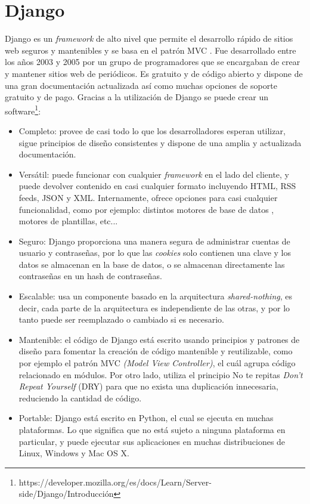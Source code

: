 \section{Django}
\label{cap:sec:django}
Django es un \textit{framework} de alto nivel que permite el desarrollo rápido de sitios web seguros y mantenibles y se basa en el patrón MVC \citep{TFGEmociones}. Fue desarrollado entre los años 2003 y 2005 por un grupo de programadores que se encargaban de crear y mantener sitios web de periódicos. 
Es gratuito y de código abierto y dispone de una gran documentación actualizada así como muchas opciones de soporte gratuito y de pago. Gracias a la utilización de Django se puede crear un software\footnote{https://developer.mozilla.org/es/docs/Learn/Server-side/Django/Introducción}:
\begin{itemize}
	\item Completo: provee de casi todo lo que los desarrolladores esperan utilizar, sigue principios de diseño consistentes y dispone de una amplia y actualizada documentación.
	\item Versátil: puede funcionar con cualquier \textit{framework} en el lado del cliente, y puede devolver contenido en casi cualquier formato incluyendo HTML, RSS feeds, JSON y XML. Internamente, ofrece opciones para casi cualquier funcionalidad, como por ejemplo: distintos motores de base de datos , motores de plantillas, etc...
	\item Seguro: Django proporciona una manera segura de administrar cuentas de usuario y contraseñas, por lo que las \textit{cookies} solo contienen una clave y los datos se almacenan en la base de datos, o se almacenan directamente las contraseñas en un hash de contraseñas.
	\item Escalable: usa un componente basado en la arquitectura \textit{shared-nothing}, es decir, cada parte de la arquitectura es independiente de las otras, y por lo tanto puede ser reemplazado o cambiado si es necesario.
	\item Mantenible: el código de Django está escrito usando principios y patrones de diseño para fomentar la creación de código mantenible y reutilizable, como por ejemplo el patrón MVC \textit{(Model View Controller)}, el cuál agrupa código relacionado en módulos.  Por otro lado, utiliza el principio No te repitas \textit{Don't Repeat Yourself} (DRY) para que no exista una duplicación innecesaria, reduciendo la cantidad de código. 
	\item Portable: Django está escrito en Python, el cual se ejecuta en muchas plataformas. Lo que significa que no está sujeto a ninguna plataforma en particular, y puede ejecutar sus aplicaciones en muchas distribuciones de Linux, Windows y Mac OS X.
\end{itemize}

